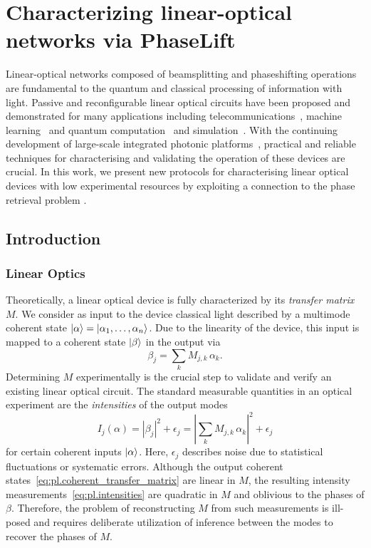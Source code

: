 
\chapter{Characterizing linear-optical networks via PhaseLift}%
\label{chap:phaselift}


Linear-optical networks composed of beamsplitting and phaseshifting operations are fundamental to the quantum and classical processing of information with light.
Passive and reconfigurable linear optical circuits have been proposed and demonstrated for many applications including telecommunications~\cite{Miller_2015_Sorting}, machine learning~\cite{Shen_2017_Deep} and quantum computation~\cite{Carolan_2015_Universal} and simulation~\cite{Harris_2017_Quantum}.
With the continuing development of large-scale integrated photonic platforms~\cite{Silverstone_2016_Silicon,Seok_2016_LargeScale}, practical and reliable techniques for characterising and validating the operation of these devices are crucial.
In this work, we present new protocols for characterising linear optical devices with low experimental resources by exploiting a connection to the phase retrieval problem \cite{Walther_1963_Question}.

\section{Introduction}
\subsection{Linear Optics}

Theoretically, a linear optical device is fully characterized by its \emph{transfer matrix} ${M}$.
We consider as input to the device classical light described by a multimode coherent state $\ket{{\alpha}} = \ket{\alpha_1, \ldots, \alpha_n}$.
Due to the linearity of the device, this input is mapped to a coherent state $\ket{{\beta}}$ in the output via
\[
  \beta_j = \sum_k M_{j,k} \,\alpha_k.
  \label{eq:pl.coherent_transfer_matrix}
\]
Determining ${M}$ experimentally is the crucial step to validate and verify an existing linear optical circuit.
The standard measurable quantities in an optical experiment are the \emph{intensities} of the output modes
\[
  I_j({\alpha})
  = \left| \beta_j \right|^2 + \epsilon_j
  = \left| \sum_k M_{j,k} \, \alpha_k \right|^2 + \epsilon_j
  \label{eq:pl.intensities}
\]
for certain coherent inputs $\ket{{\alpha}}$.
Here, $\epsilon_j$ describes noise due to statistical fluctuations or systematic errors.
Although the output coherent states~\eqref{eq:pl.coherent_transfer_matrix} are linear in ${M}$, the resulting intensity measurements~\eqref{eq:pl.intensities} are quadratic in ${M}$ and oblivious to the phases of $\beta$.
Therefore, the problem of reconstructing ${M}$ from such measurements is ill-posed and requires deliberate utilization of inference between the modes to recover the phases of $M$.

